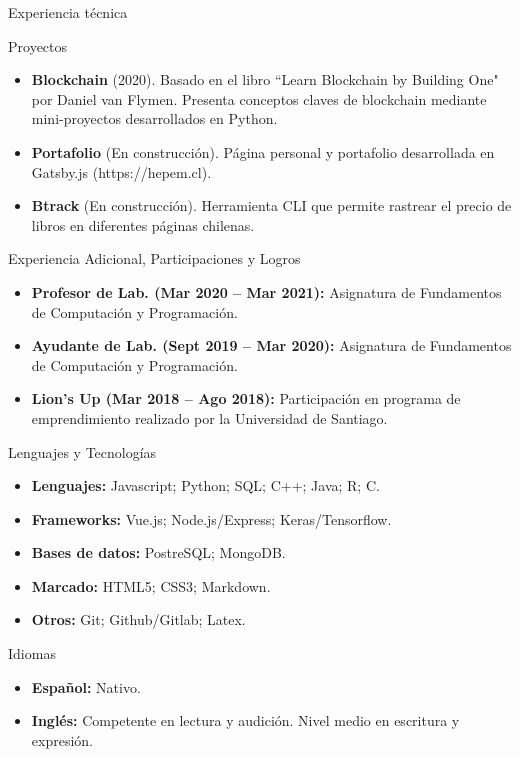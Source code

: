 \documentclass[]{mcdowellcv}
\begin{document}
	\begin{cvsection}{Experiencia técnica}
		\begin{cvsubsection}{Proyectos}{}{}
			\begin{itemize}
				\item \textbf{Blockchain} (2020). Basado en el libro ``Learn Blockchain by Building One" por Daniel van Flymen. Presenta conceptos claves de blockchain mediante mini-proyectos desarrollados en Python.
				\item \textbf{Portafolio} (En construcción). Página personal y portafolio desarrollada en Gatsby.js (https://hepem.cl).
				\item \textbf{Btrack} (En construcción). Herramienta CLI que permite rastrear el precio de libros en diferentes páginas chilenas.
			\end{itemize}
		\end{cvsubsection}
	\end{cvsection}
	
	\begin{cvsection}{Experiencia Adicional, Participaciones y Logros}
		\begin{cvsubsection}{}{}{}	
			\begin{itemize}
				\item \textbf{Profesor de Lab. (Mar 2020 – Mar 2021):} Asignatura de Fundamentos de Computación y Programación.
				\item \textbf{Ayudante de Lab. (Sept 2019 – Mar 2020):} Asignatura de Fundamentos de Computación y Programación.
				\item \textbf{Lion's Up (Mar 2018 – Ago 2018):} Participación en programa de emprendimiento realizado por la Universidad de Santiago.
			\end{itemize}
		\end{cvsubsection}
	\end{cvsection}
	
	\begin{cvsection}{Lenguajes y Tecnologías}
		\begin{cvsubsection}{}{}{}	
			\begin{itemize}
				\item \textbf{Lenguajes: } Javascript; Python; SQL; C++; Java; R; C. 
				\item \textbf{Frameworks: } Vue.js; Node.js/Express; Keras/Tensorflow. 
				\item \textbf{Bases de datos: } PostreSQL; MongoDB.
				\item \textbf{Marcado: } HTML5; CSS3; Markdown.
				\item \textbf{Otros: } Git; Github/Gitlab; Latex. 

			\end{itemize}
		\end{cvsubsection}
	\end{cvsection}

	\begin{cvsection}{Idiomas}
		\begin{cvsubsection}{}{}{}	
			\begin{itemize}
				\item \textbf{Español:} Nativo. 
				\item \textbf{Inglés:} Competente en lectura y audición. Nivel medio en escritura y expresión.
			\end{itemize}
		\end{cvsubsection}
	\end{cvsection}
	
\end{document}
